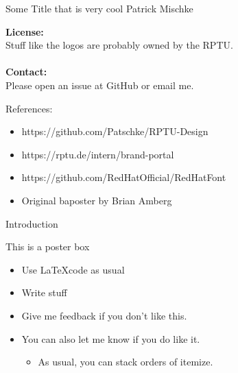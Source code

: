 \documentclass[
  a0paper,
  portrait,
  fontscale=.35 %
  ]{baposterrptu}
\begin{document}
\begin{poster}{
  }
  {}%
  {Some Title that is very cool}
  {Patrick Mischke}
  {\rptuLogo}
  {
    \begin{minipage}{.8\footerheight}
    \end{minipage}
    \hfill
    \begin{minipage}{.4\paperwidth}
      \textbf{License:}\\
      Stuff like the logos are probably owned by the RPTU.\\\\
      \textbf{Contact:}\\
      Please open an issue at GitHub or email me.
    \end{minipage}
  }
  {
    References:
    \begin{itemize}
      \item https://github.com/Patschke/RPTU-Design
      \item https://rptu.de/intern/brand-portal
      \item https://github.com/RedHatOfficial/RedHatFont
      \item Original baposter by Brian Amberg
    \end{itemize}
  }
  \begin{posterbox}[name=intro,column=0,row=0]{Introduction}

    This is a poster box

    \begin{itemize}
      \item Use \LaTeX code as usual
      \item Write stuff
      \item Give me feedback if you don't like this.
      \item You can also let me know if you do like it.
            \begin{itemize}
              \item As usual, you can stack orders of itemize.
            \end{itemize}
    \end{itemize}


\end{posterbox}
\end{poster}
\end{document}
